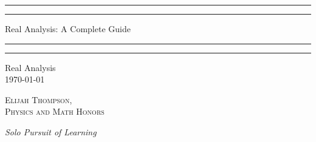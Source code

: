 \documentclass[12pt, a4paper, oneside, openright, titlepage]{book}
\begin{document}

\begin{titlepage}
    \centering
    \scshape
    \vspace*{\baselineskip}
    \rule{\textwidth}{1.6pt}\vspace*{-\baselineskip}\vspace*{2pt}
    \rule{\textwidth}{0.4pt}
    
    \vspace{0.75\baselineskip}
    
    {\LARGE Real Analysis: A Complete Guide}
    
    \vspace{0.75\baselineskip}
    
    \rule{\textwidth}{0.4pt}\vspace*{-\baselineskip}\vspace{3.2pt}
    \rule{\textwidth}{1.6pt}
    
    \vspace{2\baselineskip}
    Real Analysis \\
    \vspace*{3\baselineskip}
    \monthdayyeardate\today \\
    \vspace*{5.0\baselineskip}
    
    {\scshape\Large Elijah Thompson, \\ Physics and Math Honors\\}
    
    \vspace{1.0\baselineskip}
    \textit{Solo Pursuit of Learning}
    \vfill
    \enlargethispage{1in}
    \begin{figure}[b!]
    \end{figure}
\end{titlepage}
\end{document}
